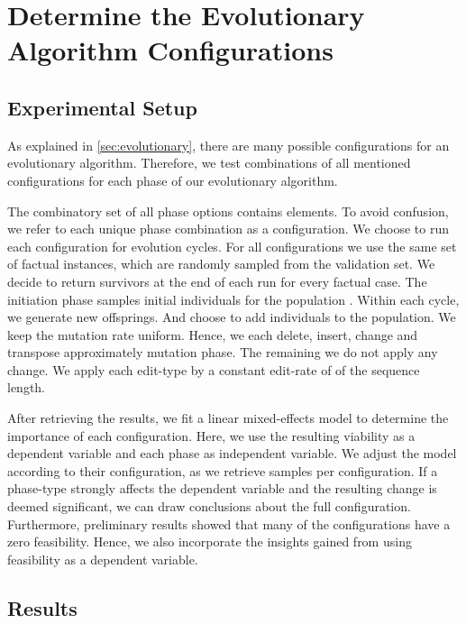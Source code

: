 \documentclass[./../../paper.tex]{subfiles}
\begin{document}
\section{Determine the Evolutionary Algorithm Configurations}

\subsection{Experimental Setup}
\label{sec:exp1}
As explained in \autoref{sec:evolutionary}, there are many possible configurations for an evolutionary algorithm. Therefore, we test combinations of all mentioned configurations for each phase of our evolutionary algorithm. 

The combinatory set of all phase options contains  elements. To avoid confusion, we refer to each unique phase combination as a configuration. We choose to run each configuration for  evolution cycles. For all configurations we use the same set of  factual \glspl{instance}, which are randomly sampled from the validation set. We decide to return  survivors at the end of each run for every factual case. The initiation phase samples  initial individuals for the population . Within each cycle, we generate  new offsprings. And choose to add  individuals to the population. We keep the mutation rate uniform. Hence, we each delete, insert, change and transpose approximately  mutation phase. The remaining  we do not apply any change. We apply each edit-type by a constant edit-rate of  of the sequence length. 

After retrieving the results, we fit a linear mixed-effects model to determine the importance of each configuration. Here, we use the resulting viability as a dependent variable and each phase as independent variable. We adjust the model according to their configuration, as we retrieve  samples per configuration. If a phase-type strongly affects the dependent variable and the resulting change is deemed significant, we can draw conclusions about the full configuration. Furthermore, preliminary results showed that many of the configurations have a zero feasibility. Hence, we also incorporate the insights gained from using feasibility as a dependent variable.

\subsection{Results}
\end{document}
